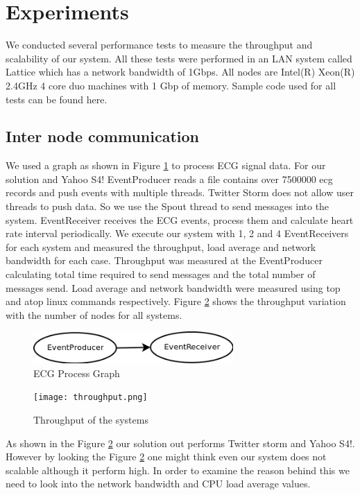 \section{Experiments}

We conducted several performance tests to measure the throughput and scalability of our system. All these tests were performed in an LAN system called Lattice which has a network bandwidth of 1Gbps. All nodes are Intel(R) Xeon(R) 2.4GHz 4 core duo machines with 1 Gbp of memory. Sample code used for all tests can be found here.

\subsection{Inter node communication}
We used a graph as shown in Figure \ref{ecgGraph} to process ECG signal data. For our solution and Yahoo S4! EventProducer reads a file contains over 7500000 ecg records and push events with multiple threads. Twitter Storm does not allow user threads to push data. So we use the Spout thread to send messages into the system. EventReceiver  receives the ECG events, process them and calculate heart rate interval periodically.  
We execute our system with 1, 2 and 4  EventReceivers for each system and measured the throughput, load average and network bandwidth  for each case. Throughput was measured at the EventProducer calculating total time required to send messages and the total number of messages send. Load average and network bandwidth were measured using top and atop linux commands respectively. Figure \ref{throuput} shows the throughput variation with the number of nodes for all systems. 

\begin{figure}[!t]
        \centering
        \includegraphics[width=3.0in]{ecgGraph.png}
        \caption{ECG Process Graph}
        \label{ecgGraph}
\end{figure}
\begin{figure}[!t]
        \centering
        \texttt{[image: throughput.png]}
        \caption{Throughput of the systems}
        \label{throuput}
\end{figure}

As shown in the Figure \ref{throuput} our solution out performs Twitter storm and Yahoo S4!. However by looking the Figure \ref{throuput} one might think even our system does not scalable although it perform high. In order to examine the reason behind this we need to look into the network bandwidth and CPU load average values. 
 
